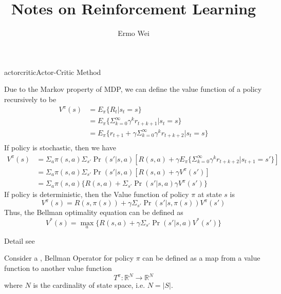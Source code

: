 \documentclass[9pt]{article}
\begin{document}
\title{Notes on Reinforcement Learning}
\author{Ermo Wei}
\date{}

\maketitle

\tableofcontents
\hypersetup{colorlinks=blue}

\clearpage 

\newcommand{\lackcite}

\ItemTitle{actorcritic}{Actor-Critic Method} \Working

 Due to the Markov property of MDP, we can define the value function of a policy recursively to be 
\begin{displaymath}
  \begin{split}
    V^{\pi}(s) & = E_{\pi}\{R_t|s_t=s\}\\
    & = E_{\pi}\{\Sigma_{k=0}^{\infty}{\gamma^{k}r_{t+k+1}}|s_t = s\}\\
    & = E_{\pi}\{r_{t+1}+\gamma \Sigma_{k=0}^{\infty}{\gamma^{k}r_{t+k+2}}|s_t = s\}\\
  \end{split}
\end{displaymath}
If policy is stochastic, then we have
\begin{displaymath}
  \begin{split}
    V^{\pi}(s) & = \Sigma_{a}\pi(s,a)\Sigma_{s'}\Pr(s'|s,a)[R(s,a)+\gamma E_{\pi}\{\Sigma_{k=0}^{\infty}\gamma^{k}r_{t+k+2}|s_{t+1}=s'\}]\\
    & = \Sigma_{a}\pi(s,a)\Sigma_{s'}\Pr(s'|s,a)[R(s,a)+\gamma V^{\pi}(s')]\\
    & = \Sigma_{a}\pi(s,a)\{R(s,a)+\Sigma_{s'}\Pr(s'|s,a)\gamma V^{\pi}(s')\}
  \end{split}
\end{displaymath}
If policy is deterministic, then the Value function of policy $\pi$ at state $s$ is
\begin{displaymath}
  V^{\pi}(s) = R(s,\pi(s))+\gamma \Sigma_{s'}\Pr(s'|s,\pi(s))V^{\pi}(s')
\end{displaymath}
Thus, the Bellman optimality equation can be defined as
\begin{displaymath}
  V^{*}(s) = \max_a \{R(s,a)+\gamma \Sigma_{s'}\Pr(s'|s,a)V^{*}(s')\}
\end{displaymath}

Detail see \citep{barto1998reinforcement}

 Consider a , Bellman Operator for policy $\pi$ can be defined as a map from a value function to another value function
\begin{displaymath}
  T^\pi:\mathbb{R}^N \rightarrow \mathbb{R}^N
\end{displaymath}
where $N$ is the cardinality of state space, i.e. $N = |S|$.
\end{document}
